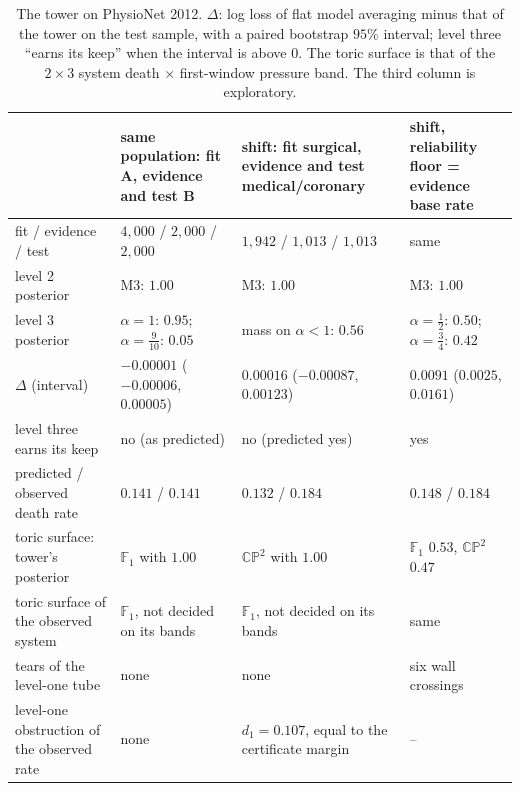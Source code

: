 \documentclass[11pt]{article}
\theoremstyle{definition}
\theoremstyle{remark}
\begin{document}
\begin{table}[!htbp]
\centering\footnotesize
\caption{The tower on PhysioNet 2012. $\Delta$: log loss of flat model averaging minus that of the tower on the test sample, with a
paired bootstrap $95\%$ interval; level three ``earns its keep'' when the interval is above $0$. The toric surface is that of the $2\times3$
system death $\times$ first-window pressure band. The third column is exploratory.}\label{tab:towericu}
\setlength{\tabcolsep}{3pt}
\begin{tabular}{>{\raggedright}p{3.6cm}>{\raggedright}p{3.6cm}>{\raggedright}p{3.6cm}>{\raggedright\arraybackslash}p{3.6cm}}
\toprule
 & same population: fit A, evidence and test B & shift: fit surgical, evidence and test medical/coronary & shift, reliability floor = evidence base rate\\
\midrule
fit / evidence / test & $4{,}000$ / $2{,}000$ / $2{,}000$ & $1{,}942$ / $1{,}013$ / $1{,}013$ & same\\
level 2 posterior & M3: $1.00$ & M3: $1.00$ & M3: $1.00$\\
level 3 posterior & $\alpha=1$: $0.95$; $\alpha=\frac9{10}$: $0.05$ & mass on $\alpha<1$: $0.56$ & $\alpha=\frac12$: $0.50$; $\alpha=\frac34$: $0.42$\\
$\Delta$ (interval) & $-0.00001$ ($-0.00006$, $0.00005$) & $0.00016$ ($-0.00087$, $0.00123$) & $0.0091$ ($0.0025$, $0.0161$)\\
level three earns its keep & no (as predicted) & no (predicted yes) & yes\\
predicted / observed death rate & $0.141$ / $0.141$ & $0.132$ / $0.184$ & $0.148$ / $0.184$\\
toric surface: tower's posterior & $\mathbb F_1$ with $1.00$ & $\mathbb{CP}^2$ with $1.00$ & $\mathbb F_1$ $0.53$, $\mathbb{CP}^2$ $0.47$\\
toric surface of the observed system & $\mathbb F_1$, not decided on its bands & $\mathbb F_1$, not decided on its bands & same\\
tears of the level-one tube & none & none & six wall crossings\\
level-one obstruction of the observed rate & none & $d_1=0.107$, equal to the certificate margin & --\\
\bottomrule
\end{tabular}
\end{table}
\end{document}

